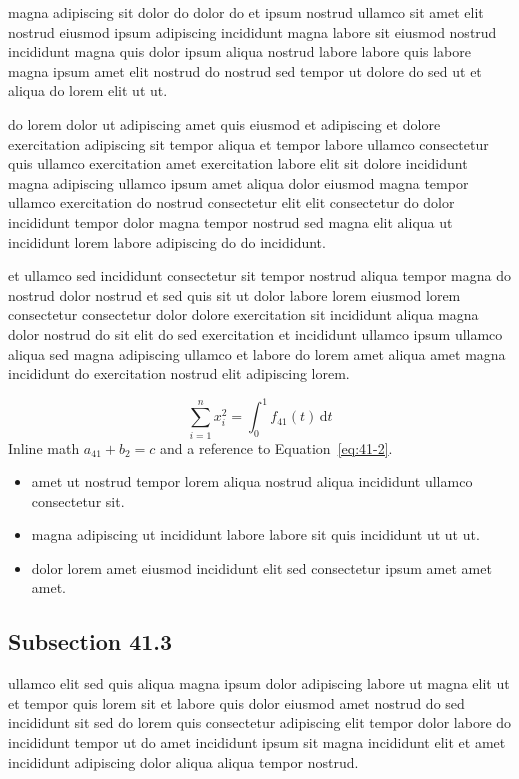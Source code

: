\documentclass{article}
\begin{document}
magna adipiscing sit dolor do dolor do et ipsum nostrud ullamco sit amet elit nostrud eiusmod ipsum adipiscing incididunt magna labore sit eiusmod nostrud incididunt magna quis dolor ipsum aliqua nostrud labore labore quis labore magna ipsum amet elit nostrud do nostrud sed tempor ut dolore do sed ut et aliqua do lorem elit ut ut.

do lorem dolor ut adipiscing amet quis eiusmod et adipiscing et dolore exercitation adipiscing sit tempor aliqua et tempor labore ullamco consectetur quis ullamco exercitation amet exercitation labore elit sit dolore incididunt magna adipiscing ullamco ipsum amet aliqua dolor eiusmod magna tempor ullamco exercitation do nostrud consectetur elit elit consectetur do dolor incididunt tempor dolor magna tempor nostrud sed magna elit aliqua ut incididunt lorem labore adipiscing do do incididunt.

et ullamco sed incididunt consectetur sit tempor nostrud aliqua tempor magna do nostrud dolor nostrud et sed quis sit ut dolor labore lorem eiusmod lorem consectetur consectetur dolor dolore exercitation sit incididunt aliqua magna dolor nostrud do sit elit do sed exercitation et incididunt ullamco ipsum ullamco aliqua sed magna adipiscing ullamco et labore do lorem amet aliqua amet magna incididunt do exercitation nostrud elit adipiscing lorem.

\begin{equation}\label{eq:41-2}
  \sum_{i=1}^{n} x_i^{2} = \int_0^1 f_{41}(t)\,\mathrm{d}t
\end{equation}
Inline math $a_{41} + b_{2} = c$ and a reference to Equation~\eqref{eq:41-2}.

\begin{itemize}
  \item amet ut nostrud tempor lorem aliqua nostrud aliqua incididunt ullamco consectetur sit.
  \item magna adipiscing ut incididunt labore labore sit quis incididunt ut ut ut.
  \item dolor lorem amet eiusmod incididunt elit sed consectetur ipsum amet amet amet.
\end{itemize}

\subsection{Subsection 41.3}\label{sec:41-3}
ullamco elit sed quis aliqua magna ipsum dolor adipiscing labore ut magna elit ut et tempor quis lorem sit et labore quis dolor eiusmod amet nostrud do sed incididunt sit sed do lorem quis consectetur adipiscing elit tempor dolor labore do incididunt tempor ut do amet incididunt ipsum sit magna incididunt elit et amet incididunt adipiscing dolor aliqua aliqua tempor nostrud.
\end{document}
